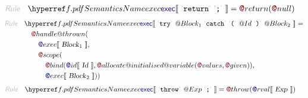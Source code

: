\begin{align*}
  \KEY{Rule} \quad
    & \SEMREF{exec} \LEFTPHRASE \
                            \LEX{return} \ \LEX{{;}} \
                          \RIGHTPHRASE  = 
      \FUN@return
        (  \FUN@null )
\end{align*}
\begin{align*}
  \KEY{Rule} \quad
    & \SEMREF{exec} \LEFTPHRASE \
                            \LEX{try} \ \VAR@Block\SUB{1} \ \LEX{catch} \ \LEX{{(}} \ \VAR@Id \ \LEX{{)}} \ \VAR@Block\SUB{2} \
                          \RIGHTPHRASE  = \\&\quad
      \FUN@handle@thrown
        ( \\&\quad\quad \SEM@exec \LEFTPHRASE \
                        \VAR{Block}\SUB{1} \
                      \RIGHTPHRASE , \\&\quad\quad
               \FUN@scope
                ( \\&\quad\quad\quad \FUN@bind
                        (  \SEM@id \LEFTPHRASE \
                                        \VAR{Id} \
                                      \RIGHTPHRASE , 
                               \FUN@allocate@initialised@variable
                                (  \FUN@values, 
                                       \FUN@given ) ), \\&\quad\quad\quad
                       \SEM@exec \LEFTPHRASE \
                                \VAR{Block}\SUB{2} \
                              \RIGHTPHRASE  ) )
\end{align*}
\begin{align*}
  \KEY{Rule} \quad
    & \SEMREF{exec} \LEFTPHRASE \
                            \LEX{throw} \ \VAR@Exp \ \LEX{{;}} \
                          \RIGHTPHRASE  = 
      \FUN@throw
        (  \SEM@rval \LEFTPHRASE \
                        \VAR{Exp} \
                      \RIGHTPHRASE  )
\end{align*}


